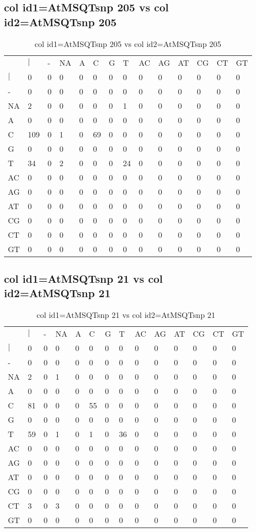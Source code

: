 \subsection{col id1=AtMSQTsnp 205 vs col id2=AtMSQTsnp 205}
\begin{center}
\begin{longtable}{|l|l|l|l|l|l|l|l|l|l|l|l|l|l|}
\caption{col id1=AtMSQTsnp 205 vs col id2=AtMSQTsnp 205} \label{table_dm574}\\
\hline
\\
\hline
&$|$&-&NA&A&C&G&T&AC&AG&AT&CG&CT&GT\\
$|$&0&0&0&0&0&0&0&0&0&0&0&0&0\\
-&0&0&0&0&0&0&0&0&0&0&0&0&0\\
NA&2&0&0&0&0&0&1&0&0&0&0&0&0\\
A&0&0&0&0&0&0&0&0&0&0&0&0&0\\
C&109&0&1&0&69&0&0&0&0&0&0&0&0\\
G&0&0&0&0&0&0&0&0&0&0&0&0&0\\
T&34&0&2&0&0&0&24&0&0&0&0&0&0\\
AC&0&0&0&0&0&0&0&0&0&0&0&0&0\\
AG&0&0&0&0&0&0&0&0&0&0&0&0&0\\
AT&0&0&0&0&0&0&0&0&0&0&0&0&0\\
CG&0&0&0&0&0&0&0&0&0&0&0&0&0\\
CT&0&0&0&0&0&0&0&0&0&0&0&0&0\\
GT&0&0&0&0&0&0&0&0&0&0&0&0&0\\
\hline
\end{longtable}
\end{center}

\subsection{col id1=AtMSQTsnp 21 vs col id2=AtMSQTsnp 21}
\begin{center}
\begin{longtable}{|l|l|l|l|l|l|l|l|l|l|l|l|l|l|}
\caption{col id1=AtMSQTsnp 21 vs col id2=AtMSQTsnp 21} \label{table_dm576}\\
\hline
\\
\hline
&$|$&-&NA&A&C&G&T&AC&AG&AT&CG&CT&GT\\
$|$&0&0&0&0&0&0&0&0&0&0&0&0&0\\
-&0&0&0&0&0&0&0&0&0&0&0&0&0\\
NA&2&0&1&0&0&0&0&0&0&0&0&0&0\\
A&0&0&0&0&0&0&0&0&0&0&0&0&0\\
C&81&0&0&0&55&0&0&0&0&0&0&0&0\\
G&0&0&0&0&0&0&0&0&0&0&0&0&0\\
T&59&0&1&0&1&0&36&0&0&0&0&0&0\\
AC&0&0&0&0&0&0&0&0&0&0&0&0&0\\
AG&0&0&0&0&0&0&0&0&0&0&0&0&0\\
AT&0&0&0&0&0&0&0&0&0&0&0&0&0\\
CG&0&0&0&0&0&0&0&0&0&0&0&0&0\\
CT&3&0&3&0&0&0&0&0&0&0&0&0&0\\
GT&0&0&0&0&0&0&0&0&0&0&0&0&0\\
\hline
\end{longtable}
\end{center}


